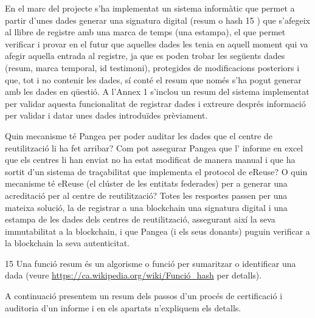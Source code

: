 \documentclass[
]{book}
\begin{document}
En el marc del projecte s'ha implementat un sistema informàtic que permet a partir d'unes dades generar una signatura digital (resum o hash 15 ) que s'afegeix al llibre de registre amb una marca de temps (una estampa), el que permet verificar i provar en el futur que aquelles dades les tenia en aquell moment qui va afegir aquella entrada al registre, ja que es poden trobar les següents dades (resum, marca temporal, id testimoni), protegides de modificacions posteriors i que, tot i no contenir les dades, sí conté el resum que només s'ha pogut generar amb les dades en qüestió. A l'Annex 1 s'inclou un resum del sistema implementat per validar aquesta
funcionalitat de registrar dades i extreure després informació per validar i datar unes dades introduïdes prèviament.

Quin mecanisme té Pangea per poder auditar les dades que el centre de reutilització li ha fet arribar? Com pot assegurar Pangea que l' informe en excel que els centres li han enviat no ha estat modificat de manera manual i que ha sortit d'un sistema de traçabilitat que implementa el protocol de eReuse? O quin mecanisme té eReuse (el clúster de les entitats federades) per a generar una acreditació per al centre de reutilització? Totes les respostes passen per una mateixa solució, la de registrar a una blockchain una signatura digital i una estampa de les dades dels centres de reutilització, assegurant així la seva immutabilitat a la blockchain, i que
Pangea (i els seus donants) puguin verificar a la blockchain la seva autenticitat.

15 Una funció resum és un algorisme o funció per sumaritzar o identificar una dada (veure \url{https://ca.wikipedia.org/wiki/Funció_hash} per detalls).

A continuació presentem un resum dels passos d'un procés de certificació i auditoria d'un informe i en els apartats n'expliquem els detalls.
\end{document}

